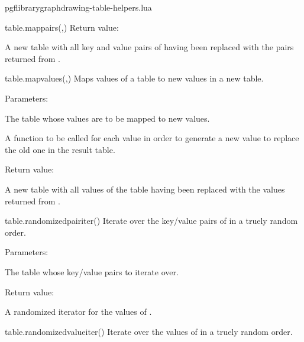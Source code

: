 \begin{filedescription}{pgflibrarygraphdrawing-table-helpers.lua}
\begin{luacommand}{{table.map\textunderscore{}pairs}(,)}
Return value:
\begin{parameterdescription} 
  \item[] A new table with all key and value pairs of  having been replaced with the pairs returned from . 
\end{parameterdescription}


\end{luacommand}
\begin{luacommand}{{table.map\textunderscore{}values}(,)}
Maps values of a table to new values in a new table. 

Parameters:
\begin{parameterdescription}
	\item[\meta{input}] The table whose values are to be mapped to new values.\item[\meta{map\_func}] A function to be called for each value in order to generate a new value to replace the old one in the result table. 
\end{parameterdescription}


Return value:
\begin{parameterdescription} 
  \item[] A new table with all values of the  table having been replaced with the values returned from . 
\end{parameterdescription}


\end{luacommand}
\begin{luacommand}{{table.randomized\textunderscore{}pair\textunderscore{}iter}()}
Iterate over the key/value pairs of  in a truely random order. 

Parameters:
\begin{parameterdescription}
	\item[\meta{table}] The table whose key/value pairs to iterate over. 
\end{parameterdescription}


Return value:
\begin{parameterdescription} 
  \item[] A randomized iterator for the values of . 
\end{parameterdescription}


\end{luacommand}
\begin{luacommand}{{table.randomized\textunderscore{}value\textunderscore{}iter}()}
Iterate over the values of  in a truely random order. 


\end{luacommand}
\end{filedescription}
